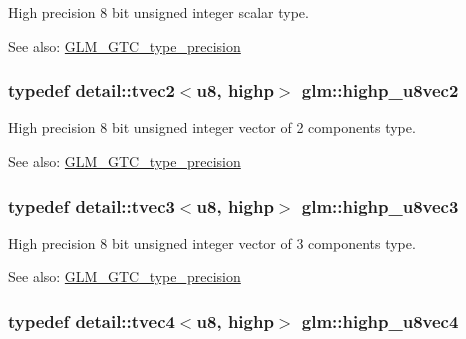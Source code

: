High precision 8 bit unsigned integer scalar type. \begin{Desc}
\item[See also:]\hyperlink{group__gtc__type__precision}{GLM\_\-GTC\_\-type\_\-precision} \end{Desc}
\hypertarget{group__gtc__type__precision_g9aed4b3bacd37a43ec369bcf76be144a}{
\subsubsection[highp\_\-u8vec2]{\setlength{\rightskip}{0pt plus 5cm}typedef detail::tvec2$<$u8, highp$>$ {\bf glm::highp\_\-u8vec2}}}
\label{group__gtc__type__precision_g9aed4b3bacd37a43ec369bcf76be144a}


High precision 8 bit unsigned integer vector of 2 components type. \begin{Desc}
\item[See also:]\hyperlink{group__gtc__type__precision}{GLM\_\-GTC\_\-type\_\-precision} \end{Desc}
\hypertarget{group__gtc__type__precision_g52bdf53a4f05023c13a9b817526d249f}{
\subsubsection[highp\_\-u8vec3]{\setlength{\rightskip}{0pt plus 5cm}typedef detail::tvec3$<$u8, highp$>$ {\bf glm::highp\_\-u8vec3}}}
\label{group__gtc__type__precision_g52bdf53a4f05023c13a9b817526d249f}


High precision 8 bit unsigned integer vector of 3 components type. \begin{Desc}
\item[See also:]\hyperlink{group__gtc__type__precision}{GLM\_\-GTC\_\-type\_\-precision} \end{Desc}
\hypertarget{group__gtc__type__precision_g3a46f19674a65471988b41ffdaa834c5}{
\subsubsection[highp\_\-u8vec4]{\setlength{\rightskip}{0pt plus 5cm}typedef detail::tvec4$<$u8, highp$>$ {\bf glm::highp\_\-u8vec4}}}
\label{group__gtc__type__precision_g3a46f19674a65471988b41ffdaa834c5}


